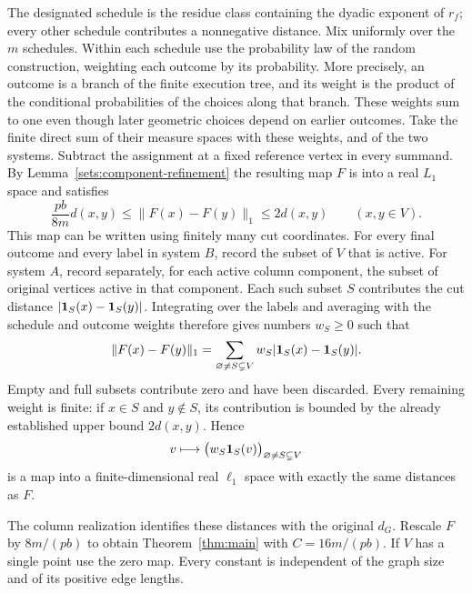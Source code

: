 The designated schedule is the residue class containing the dyadic
exponent of $r_f$; every other schedule contributes a nonnegative
distance. Mix uniformly over the $m$ schedules. Within each schedule use the
probability law of the random construction, weighting each outcome by
its probability. More precisely, an outcome is a branch of the finite
execution tree, and its weight is the product of the conditional
probabilities of the choices along that branch. These weights sum to one
even though later geometric choices depend on earlier outcomes.
Take the finite direct sum of their measure spaces
with these weights, and of the two systems. Subtract the
assignment at a fixed reference vertex in every summand. By
Lemma~\ref{sets:component-refinement} the resulting map $F$ is into a
real $L_1$ space and satisfies
\[
 \frac{pb}{8m}d(x,y)\le\|F(x)-F(y)\|_1\le2d(x,y)
 \qquad(x,y\in V).
\]
This map can be written using finitely many cut coordinates. For every
final outcome and every label in system $B$, record the subset of $V$
that is active. For system $A$, record separately, for each active column
component, the subset of original vertices active in that component.
Each such subset $S$ contributes the cut distance
$|\mathbf 1_S(x)-\mathbf 1_S(y)|$. Integrating over the labels and averaging with the
schedule and outcome weights therefore gives numbers $w_S\ge0$ such that
\[
 \|F(x)-F(y)\|_1
   =\sum_{\varnothing\ne S\subsetneq V}
       w_S|\mathbf 1_S(x)-\mathbf 1_S(y)|.
\]
Empty and full subsets contribute zero and have been discarded. Every
remaining weight is finite: if $x\in S$ and $y\notin S$, its contribution
is bounded by the already established upper bound $2d(x,y)$. Hence
\[
 v\longmapsto\bigl(w_S\mathbf 1_S(v)\bigr)_{
                         \varnothing\ne S\subsetneq V}
\]
is a map into a finite-dimensional real $\ell_1$ space with exactly the
same distances as $F$.

The column realization identifies these distances with the original
$d_G$. Rescale $F$ by $8m/(pb)$ to obtain Theorem~\ref{thm:main} with
$C=16m/(pb)$. If $V$ has a single point use the zero map. Every constant
is independent of the graph size and of its positive edge lengths.
